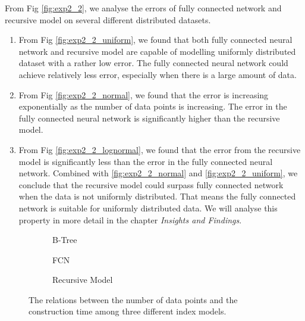 \begin{mscconclusion}
	From Fig \ref{fig:exp2_2}, we analyse the errors of fully connected network and recursive model on several different distributed datasets.
	\begin{enumerate}
		\item From Fig \ref{fig:exp2_2_uniform}, we found that both fully connected neural network and recursive model are capable of modelling uniformly distributed dataset with a rather low error. The fully connected neural network could achieve relatively less error, especially when there is a large amount of data.		
        \item From Fig \ref{fig:exp2_2_normal}, we found that the error is increasing exponentially as the number of data points is increasing. The error in the fully connected neural network is significantly higher than the recursive model.
		\item From Fig \ref{fig:exp2_2_lognormal}, we found that the error from the recursive model is significantly less than the error in the fully connected neural network. Combined with \ref{fig:exp2_2_normal} and \ref{fig:exp2_2_uniform}, we conclude that the recursive model could surpass fully connected network when the data is not uniformly distributed. That means the fully connected network is suitable for uniformly distributed data. We will analyse this property in more detail in the chapter \textit{Insights and Findings}.
	\end{enumerate}
\end{mscconclusion}

\begin{figure}
 \centering
     \begin{subfigure}[b]{0.3\textwidth}
         \centering
         
         \caption{B-Tree}
         \label{fig:exp2_3_btree}
     \end{subfigure}
     \hfill
     \begin{subfigure}[b]{0.3\textwidth}
         \centering
         
         \caption{FCN}
         \label{fig:exp2_3_fcn}
     \end{subfigure}
     \hfill
     \begin{subfigure}[b]{0.3\textwidth}
         \centering
         
         \caption{Recursive Model}
         \label{fig:exp2_3_rmi}
     \end{subfigure}
        \caption{The relations between the number of data points and the construction time among three different index models.}
        \label{fig:exp2_3}
\end{figure}

